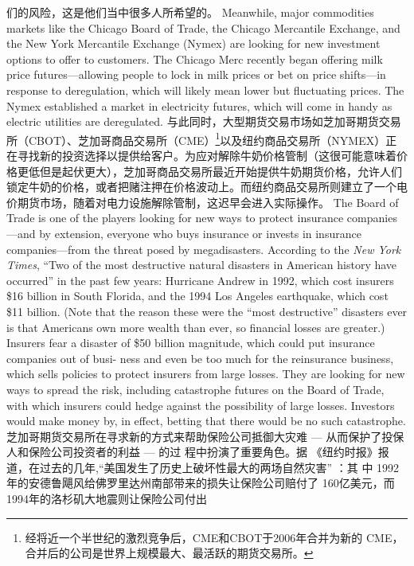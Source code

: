 \begin{paracol}{2}
们的风险，这是他们当中很多人所希望的。
\switchcolumn*
Meanwhile, major commodities markets like the Chicago
Board of Trade, the Chicago Mercantile Exchange, and the New
York Mercantile Exchange (Nymex) are looking for new investment options to offer to customers. The Chicago Merc recently began offering milk price futures---allowing people to lock in
milk prices or bet on price shifts---in response to deregulation,
which will likely mean lower but fluctuating prices. The
Nymex established a market in electricity futures, which will
come in handy as electric utilities are deregulated.
\switchcolumn
与此同时，大型期货交易市场如芝加哥期货交易所（CBOT）、芝加哥商品交易所（CME）\footnote{经将近一个半世纪的激烈竞争后，CME和CBOT于2006年合并为新的 CME，合并后的公司是世界上规模最大、最活跃的期货交易所。}以及纽约商品交易所（NYMEX）正在寻找新的投资选择以提供给客户。为应对解除牛奶价格管制（这很可能意味着价格更低但是起伏更大），芝加哥商品交易所最近开始提供牛奶期货价格，允许人们锁定牛奶的价格，或者把赌注押在价格波动上。而纽约商品交易所则建立了一个电价期货市场，随着对电力设施解除管制，这迟早会进入实际操作。
\switchcolumn*
The Board of Trade is one of the players looking for new ways
to protect insurance companies---and by extension, everyone
who buys insurance or invests in insurance companies---from
the threat posed by megadisasters. According to the \textit{New York Times}, ``Two of the most destructive natural disasters in American history have occurred'' in the past few years: Hurricane Andrew in 1992, which cost insurers \$16 billion in South Florida,
and the 1994 Los Angeles earthquake, which cost \$11 billion.
(Note that the reason these were the ``most destructive'' disasters ever is that Americans own more wealth than ever, so financial losses are greater.) Insurers fear a disaster of \$50 billion
magnitude, which could put insurance companies out of busi-
ness and even be too much for the reinsurance business, which
sells policies to protect insurers from large losses. They are looking for new ways to spread the risk, including catastrophe futures on the Board of Trade, with which insurers could hedge
against the possibility of large losses. Investors would make
money by, in effect, betting that there would be no such catastrophe.
\switchcolumn
芝加哥期货交易所在寻求新的方式来帮助保险公司抵御大灾难 --- 从而保护了投保人和保险公司投资者的利益 --- 的过
程中扮演了重要角色。据 《纽约时报》报道，在过去的几年,“美国发生了历史上破坏性最大的两场自然灾害” ：其 中 1992
年的安德鲁飓风给佛罗里达州南部带来的损失让保险公司赔付了 160亿美元，而 1994年的洛杉矶大地震则让保险公司付出

\end{paracol}
